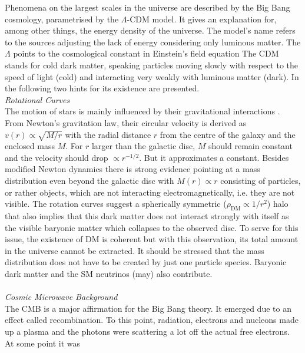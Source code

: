 Phenomena on the largest scales in the universe are described by the Big Bang cosmology, parametrised
by the $\Lambda$-CDM model. It \cite{LambdaCDM} gives an explanation for, among other things, the energy density of the 
universe. The model's name refers to the sources adjusting the lack of energy considering only luminous matter. The $\Lambda$ points to the 
cosmological constant in Einstein's field equation
The CDM stands for cold dark matter, speaking particles moving slowly with respect to the speed of light (cold) and interacting very weakly with 
luminous matter (dark). In the following two hints for its existence are presented.
\\ \textit{Rotational Curves}\\
\noindent The motion of stars is mainly influenced by their gravitational interactions \cite{LectDMLis}. From Newton's gravitation law, their circular 
velocity is derived as
$v(r)\propto\sqrt{M/r}$ with the radial distance $r$ from the centre of the galaxy and the enclosed mass $M$. For $r$ larger than the galactic 
disc, $M$ should remain constant and the velocity should drop $\propto r^{-1/2}$. But %
it approximates a constant. Besides modified Newton dynamics \cite{11015122}\cite{160607790} there is strong evidence pointing at
a mass distribution even beyond the galactic
disc with $M(r)\propto r$ consisting of particles, or rather objects, which are not interacting electromagnetically, i.e. they are not visible. The rotation curves suggest a 
spherically symmetric ($\rho_\text{DM}\propto 1/r^2$) halo that also implies that this dark matter does not interact strongly with itself as the visible 
baryonic matter which collapses to the observed disc. To serve for this issue, the existence of DM is coherent but with this observation, its total 
amount in the 
universe cannot be extracted. It should be stressed that the mass distribution does not have to be created by just one particle species. Baryonic dark matter
and the SM neutrinos (may) also contribute. \\
\\ \textit{Cosmic Microwave Background}\\
\noindent The CMB is a major affirmation for the Big Bang theory. It emerged due to an effect called recombination. 
To this point, radiation, electrons and nucleons made up a plasma and the photons were scattering a lot off the actual free electrons. At some point it was 
